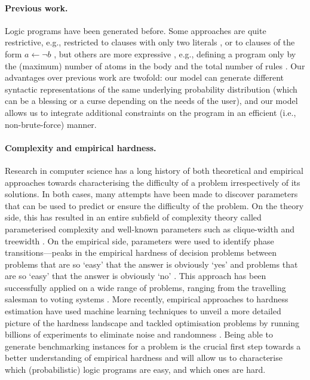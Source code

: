 \documentclass{article}
\begin{document}
\paragraph{Previous work.} Logic programs have been generated before. Some
approaches are quite restrictive, e.g., restricted to clauses with only two
literals \cite{DBLP:conf/lpnmr/NamasivayamT09}, or to clauses of the form $a
\gets \neg b$ \cite{DBLP:journals/tocl/WenWSL16}, but others are more
expressive \cite{DBLP:journals/tplp/WangWM15}, e.g., defining a program only by
the (maximum) number of atoms in the body and the total number of rules
\cite{DBLP:conf/iclp/ZhaoL03,zhao2004answer}. Our advantages over previous work
are twofold: our model can generate different syntactic representations of the
same underlying probability distribution (which can be a blessing or a curse
depending on the needs of the user), and our model allows us to integrate
additional constraints on the program in an efficient (i.e., non-brute-force)
manner.


\paragraph{Complexity and empirical hardness.} Research in computer science has
a long history of both theoretical and empirical approaches towards
characterising the difficulty of a problem irrespectively of its solutions. In
both cases, many attempts have been made to discover parameters that can be used
to predict or ensure the difficulty of the problem. On the theory side, this has
resulted in an entire subfield of complexity theory called parameterised
complexity \cite{DBLP:series/mcs/DowneyF99} and well-known parameters such as
clique-width \cite{DBLP:journals/jcss/CourcelleER93,DBLP:journals/dam/Wanke94}
and treewidth \cite{diestel2005graph}. On the empirical side, parameters were
used to identify phase transitions---peaks in the empirical hardness of decision
problems between problems that are so `easy' that the answer is obviously `yes'
and problems that are so `easy' that the answer is obviously `no'
\cite{DBLP:conf/ijcai/CheesemanKT91}. This approach has been successfully
applied on a wide range of problems, ranging from the travelling salesman
\cite{DBLP:journals/ai/GentW96} to voting systems
\cite{DBLP:conf/ijcai/Walsh09}. More recently, empirical approaches to hardness
estimation have used machine learning techniques to unveil a more detailed
picture of the hardness landscape \cite{DBLP:journals/cacm/Leyton-BrownHHX14}
and tackled optimisation problems by running billions of experiments to
eliminate noise and randomness \cite{DBLP:conf/cp/McCreeshPP19}. Being able to
generate benchmarking instances for a problem is the crucial first step towards
a better understanding of empirical hardness and will allow us to characterise
which (probabilistic) logic programs are easy, and which ones are hard.
\end{document}
